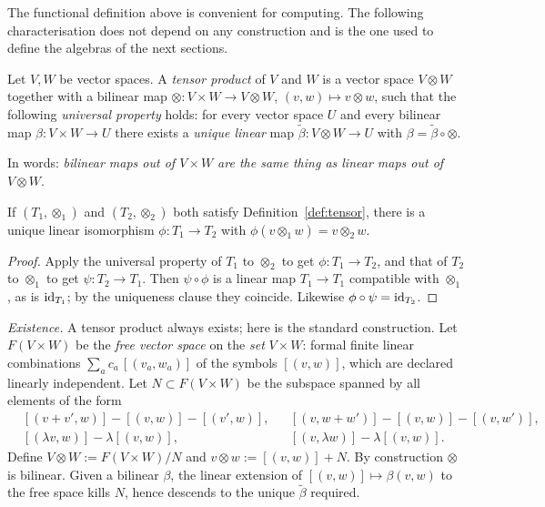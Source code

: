 The functional definition above is convenient for computing. The following characterisation does not depend on any
construction and is the one used to define the algebras of the next sections.

\begin{definition}\label{def:tensor}
Let $V,W$ be vector spaces. A \emph{tensor product} of $V$ and $W$ is a vector space
$V\otimes W$ together with a bilinear map $\otimes:V\times W\to V\otimes W$,
$(v,w)\mapsto v\otimes w$, such that the following \emph{universal property} holds:
for every vector space $U$ and every bilinear map $\beta:V\times W\to U$ there exists a
\emph{unique linear} map $\tilde\beta:V\otimes W\to U$ with $\beta=\tilde\beta\circ\otimes$.
\[

\]
\end{definition}

In words: \emph{bilinear maps out of $V\times W$ are the same thing as linear maps out of $V\otimes W$}.

\begin{proposition}[Uniqueness]
If $(T_1,\otimes_1)$ and $(T_2,\otimes_2)$ both satisfy Definition~\ref{def:tensor}, there is a unique
linear isomorphism $\phi:T_1\to T_2$ with $\phi(v\otimes_1w)=v\otimes_2w$.
\end{proposition}
\begin{proof}
Apply the universal property of $T_1$ to $\otimes_2$ to get $\phi:T_1\to T_2$, and that of $T_2$ to $\otimes_1$ to get
$\psi:T_2\to T_1$. Then $\psi\circ\phi$ is a linear map $T_1\to T_1$ compatible with $\otimes_1$, as is $\mathrm{id}_{T_1}$;
by the uniqueness clause they coincide. Likewise $\phi\circ\psi=\mathrm{id}_{T_2}$.
\end{proof}

\emph{Existence.} A tensor product always exists; here is the standard construction.
Let $F(V\times W)$ be the \emph{free vector space} on the \emph{set} $V\times W$: formal finite linear combinations
$\sum_a c_a\,[(v_a,w_a)]$ of the symbols $[(v,w)]$, which are declared linearly independent.
Let $N\subset F(V\times W)$ be the subspace spanned by all elements of the form
\begin{align*}
&[(v+v',w)]-[(v,w)]-[(v',w)], & &[(v,w+w')]-[(v,w)]-[(v,w')],\\
&[(\lambda v,w)]-\lambda[(v,w)], & &[(v,\lambda w)]-\lambda[(v,w)].
\end{align*}
Define $V\otimes W:=F(V\times W)/N$ and $v\otimes w:=[(v,w)]+N$. By construction $\otimes$ is bilinear.
Given a bilinear $\beta$, the linear extension of $[(v,w)]\mapsto\beta(v,w)$ to the free space kills $N$,
hence descends to the unique $\tilde\beta$ required. 

